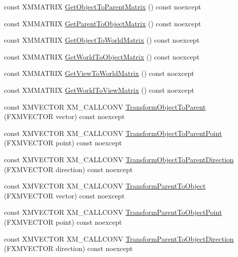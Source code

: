 \begin{DoxyCompactItemize}
const X\+M\+M\+A\+T\+R\+IX \hyperlink{structmage_1_1_transform_node_a0056c77406b7c6fc29f50b1b0de69026}{Get\+Object\+To\+Parent\+Matrix} () const noexcept
\item 
const X\+M\+M\+A\+T\+R\+IX \hyperlink{structmage_1_1_transform_node_a13efbdabf75f4a26fa8512443d0064f0}{Get\+Parent\+To\+Object\+Matrix} () const noexcept
\item 
const X\+M\+M\+A\+T\+R\+IX \hyperlink{structmage_1_1_transform_node_a793fb089a973f6c03bcedabf58ce632e}{Get\+Object\+To\+World\+Matrix} () const noexcept
\item 
const X\+M\+M\+A\+T\+R\+IX \hyperlink{structmage_1_1_transform_node_abdad2523f50f398977abf8dd6c166d89}{Get\+World\+To\+Object\+Matrix} () const noexcept
\item 
const X\+M\+M\+A\+T\+R\+IX \hyperlink{structmage_1_1_transform_node_a16586bae5004e22d543b1b931407f603}{Get\+View\+To\+World\+Matrix} () const noexcept
\item 
const X\+M\+M\+A\+T\+R\+IX \hyperlink{structmage_1_1_transform_node_add9f28faa15d91a451880de4743dd439}{Get\+World\+To\+View\+Matrix} () const noexcept
\item 
const X\+M\+V\+E\+C\+T\+OR X\+M\+\_\+\+C\+A\+L\+L\+C\+O\+NV \hyperlink{structmage_1_1_transform_node_a8a19577750036d8365cca5b4e38c08b9}{Transform\+Object\+To\+Parent} (F\+X\+M\+V\+E\+C\+T\+OR vector) const noexcept
\item 
const X\+M\+V\+E\+C\+T\+OR X\+M\+\_\+\+C\+A\+L\+L\+C\+O\+NV \hyperlink{structmage_1_1_transform_node_a449428a24f76ca18b91f84ba3e69c0f3}{Transform\+Object\+To\+Parent\+Point} (F\+X\+M\+V\+E\+C\+T\+OR point) const noexcept
\item 
const X\+M\+V\+E\+C\+T\+OR X\+M\+\_\+\+C\+A\+L\+L\+C\+O\+NV \hyperlink{structmage_1_1_transform_node_af3f7d31eeb595ac51fe2362c91688398}{Transform\+Object\+To\+Parent\+Direction} (F\+X\+M\+V\+E\+C\+T\+OR direction) const noexcept
\item 
const X\+M\+V\+E\+C\+T\+OR X\+M\+\_\+\+C\+A\+L\+L\+C\+O\+NV \hyperlink{structmage_1_1_transform_node_aa649804646f82257522c5136f0d4d2a0}{Transform\+Parent\+To\+Object} (F\+X\+M\+V\+E\+C\+T\+OR vector) const noexcept
\item 
const X\+M\+V\+E\+C\+T\+OR X\+M\+\_\+\+C\+A\+L\+L\+C\+O\+NV \hyperlink{structmage_1_1_transform_node_afb966684b63c5e24845fa93a53802b5f}{Transform\+Parent\+To\+Object\+Point} (F\+X\+M\+V\+E\+C\+T\+OR point) const noexcept
\item 
const X\+M\+V\+E\+C\+T\+OR X\+M\+\_\+\+C\+A\+L\+L\+C\+O\+NV \hyperlink{structmage_1_1_transform_node_ab7c1a1559d407f36deb342095b37e7b9}{Transform\+Parent\+To\+Object\+Direction} (F\+X\+M\+V\+E\+C\+T\+OR direction) const noexcept

\end{DoxyCompactItemize}
